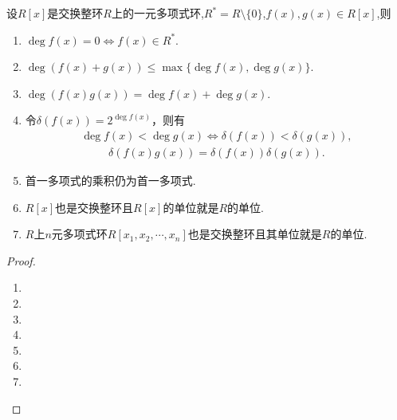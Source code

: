 \documentclass[../../main.tex]{subfiles}%
\begin{document}
\begin{theorem}\label{theorem:域上一元多项式的基本性质}
设$R[x]$是交换整环$R$上的一元多项式环,$R^*=R\setminus \{0\}$,$f(x),g(x)\in R[x]$,则
\begin{enumerate}[(1)]
\item $\deg f(x) = 0\iff f(x) \in R^*$.

\item $\deg(f(x) + g(x)) \leqslant \max\{\deg f(x), \deg g(x)\}$.

\item $\deg(f(x)g(x)) = \deg f(x) + \deg g(x)$.

\item\label{theorem:域上一元多项式的基本性质-4} 令$\delta(f(x)) = 2^{\deg f(x)}$，则有
\begin{align*}
\deg f(x) < \deg g(x) \iff \delta(f(x)) < \delta(g(x)),
\end{align*}
\begin{align*}
\delta(f(x)g(x)) = \delta(f(x))\delta(g(x)).
\end{align*}

\item  首一多项式的乘积仍为首一多项式.

\item $R[x]$也是交换整环且$R[x]$的单位就是$R$的单位.

\item $R$上$n$元多项式环$R[x_1, x_2, \cdots, x_n]$也是交换整环且其单位就是$R$的单位.
\end{enumerate}
\end{theorem}
\begin{proof}
\begin{enumerate}[(1)]
\item 

\item 

\item 

\item 

\item 

\item 

\item 
\end{enumerate}

\end{proof}
\end{document}
